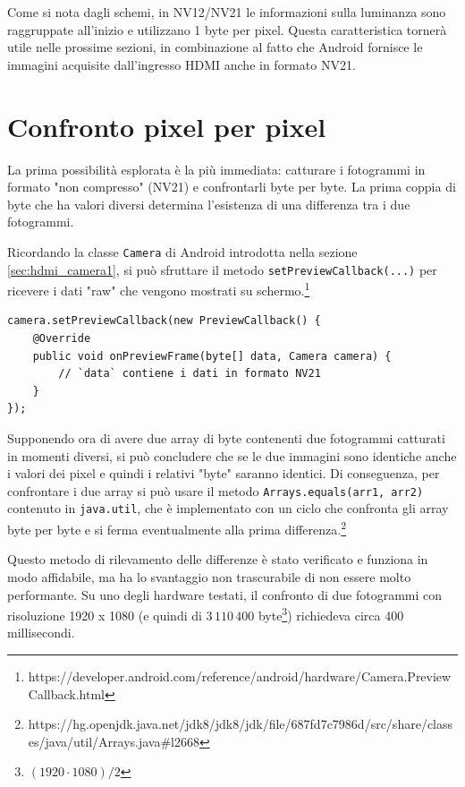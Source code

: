 Come si nota dagli schemi, in NV12/NV21 le informazioni sulla luminanza sono raggruppate all'inizio e utilizzano 1 byte per pixel. Questa caratteristica tornerà utile nelle prossime sezioni, in combinazione al fatto che Android fornisce le immagini acquisite dall'ingresso HDMI anche in formato NV21.

\section{Confronto pixel per pixel}
\label{sec:diff_full}

La prima possibilità esplorata è la più immediata: catturare i fotogrammi in formato "non compresso" (NV21) e confrontarli byte per byte. La prima coppia di byte che ha valori diversi determina l'esistenza di una differenza tra i due fotogrammi.

Ricordando la classe \texttt{Camera} di Android introdotta nella sezione \ref{sec:hdmi_camera1}, si può sfruttare il metodo \texttt{setPreviewCallback(...)} per ricevere i dati "raw" che vengono mostrati su schermo.\footnote{https://developer.android.com/reference/android/hardware/Camera.PreviewCallback.html}

\begin{verbatim}
camera.setPreviewCallback(new PreviewCallback() {
    @Override
    public void onPreviewFrame(byte[] data, Camera camera) {
        // `data` contiene i dati in formato NV21
    }
});
\end{verbatim}

Supponendo ora di avere due array di byte contenenti due fotogrammi catturati in momenti diversi, si può concludere che se le due immagini sono identiche anche i valori dei pixel e quindi i relativi "byte" saranno identici. Di conseguenza, per confrontare i due array si può usare il metodo \texttt{Arrays.equals(arr1, arr2)} contenuto in \texttt{java.util}, che è implementato con un ciclo che confronta gli array byte per byte e si ferma eventualmente alla prima differenza.\footnote{https://hg.openjdk.java.net/jdk8/jdk8/jdk/file/687fd7c7986d/src/share/classes/java/util/Arrays.java\#l2668}

Questo metodo di rilevamento delle differenze è stato verificato e funziona in modo affidabile, ma ha lo svantaggio non trascurabile di non essere molto performante. Su uno degli hardware testati, il confronto di due fotogrammi con risoluzione 1920 x 1080 (e quindi di $3\,110\,400$ byte\footnote{$(1920 \cdot 1080) / 2$}) richiedeva circa 400 millisecondi.

